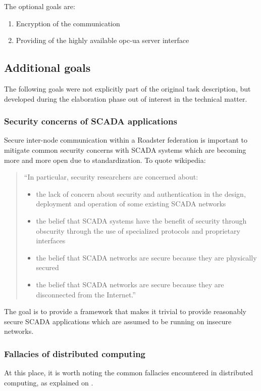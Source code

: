The optional goals are:

\begin{enumerate}
	\item Encryption of the communication
	\item Providing of the highly available \gls{opc-ua} server interface
\end{enumerate}

\subsection{Additional goals}
The following goals were not explicitly part of the original task description,
but developed during the elaboration phase out of interest in the technical
matter.

\subsubsection{Security concerns of SCADA applications}
Secure inter-node communication within a Roadster federation is important to
mitigate common security concerns with SCADA systems which are becoming more
and more open due to standardization. To quote \cite[Security issues]{wp:scada}
wikipedia:

\begin{quote}
``In particular, security researchers are concerned about:
	\begin{itemize}
		\item the lack of concern about security and authentication in
			the design, deployment and operation of some existing
			SCADA networks
		\item the belief that SCADA systems have the benefit of
			security through obscurity through the use of
			specialized protocols and proprietary interfaces
		\item the belief that SCADA networks are secure because they
			are physically secured
		\item the belief that SCADA networks are secure because they
			are disconnected from the Internet.''
	\end{itemize}
\end{quote}

The goal is to provide a framework that makes it trivial to provide reasonably
secure SCADA applications which are assumed to be running on insecure networks.

\subsubsection{Fallacies of distributed computing}
At this place, it is worth noting the common fallacies encountered in
distributed computing, as explained on \cite{dcomp:fallacies}.


